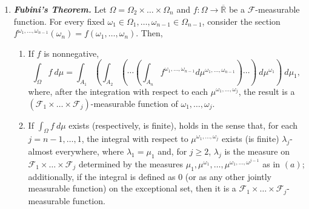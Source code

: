\begin{thrm}
\begin{enumerate}
\item \emph{\textbf{Fubini's Theorem.}} \label{theorem:Fubini's} Let \(\Omega=\Omega_2\times\dots\times\Omega_n\) and \(f\colon \Omega\to \overline{\mathbb{R}} \) be a \(\mathcal{F}\)-measurable function.
    For every fixed \(\omega_1\in\Omega_1,\dots,\omega_{n-1}\in\Omega_{n-1}\), consider the section \(f^{\omega_1,\dots,\omega_{n-1}}(\omega_n)=f(\omega_1,\dots,\omega_n)\). Then,
    \begin{enumerate}
        \item If \(f\) is nonnegative, 
            \begin{equation}\label{equation:Fubini's}
                \int_{\Omega}f~d\mu=
\int_{A_1}\left(\int_{A_2}\left(\dotsm\left(\int_{A_n}f^{\omega_1,\dots,\omega_{n-1}}d\mu^{\omega_1,\dots,\omega_{n-1}}\right)\dotsm\right)~d\mu^{\omega_1}\right)~d\mu_1
,\end{equation}
            where, after the integration with respect to each \(\mu^{\omega_1,\dots,\omega_{j}}\), the result is a \( \left(\mathcal{F}_1\times\dots\times\mathcal{F}_j\right)\)-measurable function of \(\omega_1,\dots,\omega_{j}\).
        \item If \(\int_{\Omega}f~d\mu\) exists (respectively, is finite),  holds in the sense that, for each \(j=n-1,\dots,1\), the integral with respect to  \(\mu^{\omega_1,\dots,\omega_j}\) exists (is finite) \(\lambda_j\)-almost everywhere, where \(\lambda_1=\mu_1\) and, for \(j\geq 2\), \(\lambda_j\) is the measure on \(\mathcal{F}_1\times\dots\times\mathcal{F}_j\) determined by the measures \(\mu_1,\mu^{\omega_1},\dots,\mu^{\omega_1,\dots,\omega^{j-1}}\) as in \((a)\); additionally, if the integral is defined as \(0\) (or as any other jointly measurable function) on the exceptional set, then it is a \(\mathcal{F}_1\times\dots\times\mathcal{F}_j\)-measurable function.
    \end{enumerate}
\end{enumerate}
\end{thrm}
